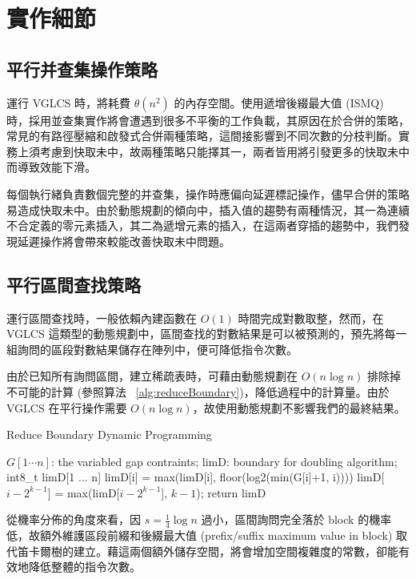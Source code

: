 \section{實作細節}
\label{sec:Implementation}

\subsection{平行并查集操作策略}

運行 VGLCS 時，將耗費 $\theta(n^2)$ 的內存空間。使用遞增後綴最大值 (ISMQ) 時，採用並查集實作將會遭遇到很多不平衡的工作負載，其原因在於合併的策略，常見的有路徑壓縮和啟發式合併兩種策略，這間接影響到不同次數的分枝判斷。實務上須考慮到快取未中，故兩種策略只能擇其一，兩者皆用將引發更多的快取未中而導致效能下滑。

每個執行緒負責數個完整的并查集，操作時應偏向延遲標記操作，儘早合併的策略易造成快取未中。由於動態規劃的傾向中，插入值的趨勢有兩種情況，其一為連續不合定義的零元素插入，其二為遞增元素的插入，在這兩者穿插的趨勢中，我們發現延遲操作將會帶來較能改善快取未中問題。

\subsection{平行區間查找策略}

運行區間查找時，一般依賴內建函數在 $O(1)$ 時間完成對數取整，然而，在 VGLCS 這類型的動態規劃中，區間查找的對數結果是可以被預測的，預先將每一組詢問的區段對數結果儲存在陣列中，便可降低指令次數。

由於已知所有詢問區間，建立稀疏表時，可藉由動態規劃在 $O(n \log n)$ 排除掉不可能的計算 (參照算法 ~\ref{alg:reduceBoundary})，降低過程中的計算量。由於 VGLCS 在平行操作需要 $O(n \log n)$，故使用動態規劃不影響我們的最終結果。

\begin{algorithm*}
  \caption{Reduce Boundary Dynamic Programming}
  \label{alg:reduceBoundary}
  \begin{algorithmic}[1]
  \Require
      $G[1 \cdots n]$: the variabled gap contraints;
  \Ensure
      $\text{limD}$: boundary for doubling algorithm;
  \State int8\_t limD[1 ... n]
    \State limD[i] = max(limD[i], floor(log2(min(G[i]+1, i))))
      \State limD[$i-2^{k-1}$] = max(limD[$i-2^{k-1}$], $k-1$);
    \EndFor
  \EndFor
  \State return limD
  \end{algorithmic}
\end{algorithm*}

從機率分佈的角度來看，因 $s = \frac{1}{4} \log n$ 過小，區間詢問完全落於 block 的機率低，故額外維護區段前綴和後綴最大值 (prefix/suffix maximum value in block) 取代笛卡爾樹的建立。藉這兩個額外儲存空間，將會增加空間複雜度的常數，卻能有效地降低整體的指令次數。